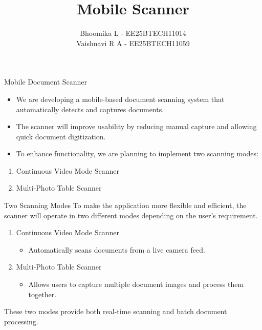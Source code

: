\documentclass{beamer}
\title %
{Mobile Scanner}
\date{}
\author %
{Bhoomika L - EE25BTECH11014\\
Vaishnavi R A - EE25BTECH11059
}
\begin{document}
\frame{\titlepage}
\begin{frame}{Mobile Document Scanner}
\begin{itemize}
    \item We are developing a mobile-based document scanning system that automatically detects and captures documents.
\item The scanner will improve usability by reducing manual capture and allowing quick document digitization.
\item To enhance functionality, we are planning to implement two scanning modes:
\end{itemize}
\begin{enumerate}
\item Continuous Video Mode Scanner
\item Multi-Photo Table Scanner
\end{enumerate}
\end{frame}

\begin{frame}{Two Scanning Modes}
    To make the application more flexible and efficient, the scanner will operate in two different modes depending on the user’s requirement.
    \begin{enumerate}
        \item Continuous Video Mode Scanner
\begin{itemize}
    \item Automatically scans documents from a live camera feed.
\end{itemize}
\item  Multi-Photo Table Scanner
\begin{itemize}
    \item Allows users to capture multiple document images and process them together.
\end{itemize}
    \end{enumerate}
    These two modes provide both real-time scanning and batch document processing.
\end{frame}
\end{document}
